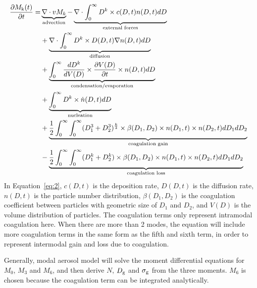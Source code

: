 \documentclass[12pt, fullpage]{uiucthesis2009}
\begin{document}
		\begin{align}\label{eq:2}
		\begin{split}
		\frac{\partial M_\text{k}(t)}{\partial t} = &
		\underbrace{\nabla \cdot vM_k}_\text{\clap{advection}} - \underbrace{\nabla \cdot \int_{0}^{\infty}D^k\times c(D,t)n(D,t)dD}_\text{\clap{external forces}} \\
		&+ \underbrace{\nabla \cdot \int_{0}^{\infty}D^k\times D(D,t)\nabla n(D,t)dD}_\text{\clap{diffusion}} \\
		&+ \underbrace{\int_{0}^{\infty}\frac{dD^k}{dV(D)}\times \frac{\partial V(D)}{\partial t}\times n(D,t)dD}_\text{\clap{condensation/evaporation}} \\
		&+ \underbrace{\int_{0}^{\infty}D^k\times \dot n(D,t)dD}_\text{\clap{nucleation}} \\
		&+ \underbrace{\frac{1}{2}\int_{0}^{\infty}\int_{0}^{\infty}
			(D_{1}^3+D_{2}^3)^{\frac{k}{3}}\times \beta(D_{1},D_2)\times n(D_1, t)\times n(D_2,t) dD_1dD_2}_\text{\clap{coagulation gain}} \\
		&-\underbrace{\frac{1}{2}\int_{0}^{\infty}\int_{0}^{\infty}
			(D_{1}^k+D_{2}^k)\times \beta(D_{1},D_2)\times n(D_1, t)\times n(D_2,t) dD_1dD_2}_\text{\clap{coagulation loss}}
		\end{split}
		\end{align}
		In Equation~\ref{eq:2}, $c(D,t)$ is the deposition rate, $D(D,t)$ is the diffusion rate, $n(D,t)$ is the particle number distribution, $\beta(D_{1},D_2)$ is the coagulation coefficient between particles with geometric size of $D_1$ and $D_2$, and $V(D)$ is the volume distribution of particles. The coagulation terms only represent intramodal coagulation here. When there are more than 2 modes, the equation will include more coagulation terms in the same form as the fifth and sixth term, in order to represent intermodal gain and loss due to coagulation.
		
		Generally, modal aerosol model will solve the moment differential equations for $M_0$, $M_3$ and $M_6$, and then derive $N$, $D_{\rm g}$ and $\sigma_{\rm g}$ from the three moments. $M_6$ is chosen because the coagulation term can be integrated analytically.
		 
\end{document}
